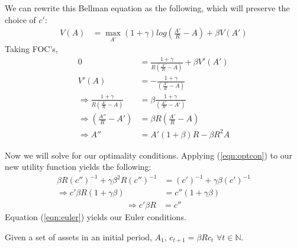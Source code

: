 \documentclass[11pt]{article} %
\DeclareMathOperator*{\argmax}{arg\,max}
\begin{document}
We can rewrite this Bellman equation as the following, which will preserve the choice of $c'$:
\begin{align*}
V(A) &= \max_{A'} (1+\gamma)log\left(\frac{A'}{R} - A \right)  + \beta V(A')
\end{align*}
Taking FOC's,
\begin{align*}
0 &= \frac{1+\gamma}{R\left(\frac{A'}{R} - A \right)} +\beta V'(A')\\
V'(A) &= -\frac{1+\gamma}{\left(\frac{A'}{R} - A \right)} \\
\Rightarrow  \frac{1+\gamma}{R\left(\frac{A'}{R} - A \right)} &=\beta \frac{1+\gamma}{\left(\frac{A''}{R} - A' \right)}\\
\Rightarrow \left(\frac{A''}{R} - A' \right) &= \beta R\left(\frac{A'}{R} - A \right)\\
\Rightarrow A'' &= A'(1+\beta)R - \beta R^2 A
\end{align*}

Now we will solve for our optimality conditions. Applying (\ref{eqn:optcon}) to our new utility function yields the following:
\begin{align*}
\beta R (c'')^{-1} + \gamma \beta^2 R (c'')^{-1}&=(c')^{-1} + \gamma \beta (c')^{-1}\\
\Rightarrow c' \beta R (1+\gamma \beta) &= c''(1+\gamma \beta)
\end{align*}
\begin{align}
\Rightarrow c'\beta R &= c'' \label{eqn:euler}
\end{align}
Equation (\ref{eqn:euler}) yields our Euler conditions. 

Given a set of assets in an initial period, $A_1$, $c_{t+1}  = \beta R c_t$ $\forall t \in \mathbb{N}$. 
%
\end{document}
